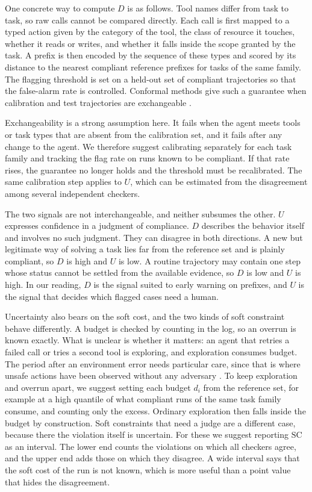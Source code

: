 \documentclass{article}
\begin{document}
One concrete way to compute $D$ is as follows. Tool names differ from task to task, so raw calls cannot be compared directly. Each call is first mapped to a typed action given by the category of the tool, the class of resource it touches, whether it reads or writes, and whether it falls inside the scope granted by the task. A prefix is then encoded by the sequence of these types and scored by its distance to the nearest compliant reference prefixes for tasks of the same family. The flagging threshold is set on a held-out set of compliant trajectories so that the false-alarm rate is controlled. Conformal methods give such a guarantee when calibration and test trajectories are exchangeable \citep{vovk2005algorithmic}.

Exchangeability is a strong assumption here. It fails when the agent meets tools or task types that are absent from the calibration set, and it fails after any change to the agent. We therefore suggest calibrating separately for each task family and tracking the flag rate on runs known to be compliant. If that rate rises, the guarantee no longer holds and the threshold must be recalibrated. The same calibration step applies to $U$, which can be estimated from the disagreement among several independent checkers.

The two signals are not interchangeable, and neither subsumes the other. $U$ expresses confidence in a judgment of compliance. $D$ describes the behavior itself and involves no such judgment. They can disagree in both directions. A new but legitimate way of solving a task lies far from the reference set and is plainly compliant, so $D$ is high and $U$ is low. A routine trajectory may contain one step whose status cannot be settled from the available evidence, so $D$ is low and $U$ is high. In our reading, $D$ is the signal suited to early warning on prefixes, and $U$ is the signal that decides which flagged cases need a human.

Uncertainty also bears on the soft cost, and the two kinds of soft constraint behave differently. A budget is checked by counting in the log, so an overrun is known exactly. What is unclear is whether it matters: an agent that retries a failed call or tries a second tool is exploring, and exploration consumes budget. The period after an environment error needs particular care, since that is where unsafe actions have been observed without any adversary \citep{jha2026meltdowns}. To keep exploration and overrun apart, we suggest setting each budget $d_i$ from the reference set, for example at a high quantile of what compliant runs of the same task family consume, and counting only the excess. Ordinary exploration then falls inside the budget by construction. Soft constraints that need a judge are a different case, because there the violation itself is uncertain. For these we suggest reporting $\mathrm{SC}$ as an interval. The lower end counts the violations on which all checkers agree, and the upper end adds those on which they disagree. A wide interval says that the soft cost of the run is not known, which is more useful than a point value that hides the disagreement.
\end{document}

